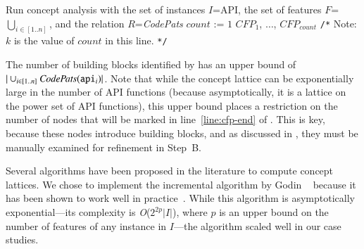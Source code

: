 \linesnumbered
\begin{algorithm}[ht!]
%
\SetVline
{}
%
%
%
Run concept analysis with the set of instances $I$=API, 
the set of features $F$=$\displaystyle\bigcup_{i\in[1..n]}$, 
and the relation $R$=\textit{CodePats}\;
%
$count$ := $1$\;
%
%
\Return $CFP_1$, $\ldots$, $CFP_{count}$ \texttt{/*} Note: $k$ is the value 
of $count$ in this line. \texttt{*/}
{\label{algorithm:candfing}}
\end{algorithm}

The number of building blocks identified by 
has an upper bound of $|\cup_{i\in[1..n]}\textit{CodePats}(\texttt{api$_i$})|$.  Note that
while the concept lattice can be exponentially large in the number of API
functions (because asymptotically, it is a lattice on the power set of API
functions), this upper bound places a restriction on the number of nodes that
will be marked in line~\ref{line:cfp-end} of . This is
key, because these nodes introduce building blocks, and as discussed in
, they must be manually examined for
refinement in Step~B.

Several algorithms have been proposed in the literature to compute concept
lattices. We chose to implement the incremental algorithm by Godin
\etal~\cite[Algorithm~1]{gma95} because it has been shown to work well in
practice~\cite{amb+03}.  While this algorithm is asymptotically
exponential---its complexity is \textit{O}($2^{2p}|I|$), where $p$ is an upper
bound on the number of features of any instance in $I$---the algorithm scaled
well in our case studies.

